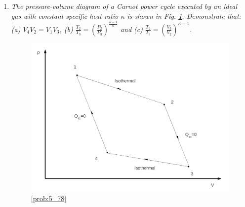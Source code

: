 \documentclass[12pts,a4paper,amsmath,amssymb,floatfix]{article}%
\newcommand{\frc}{\displaystyle\frac}
\begin{document}
\begin{enumerate}[label=\bfseries Problem \arabic*:]
\item \label{prob:5_78}{\it The pressure-volume diagram of a Carnot power cycle executed by an ideal gas with constant specific heat ratio $\kappa$ is shown in Fig. \ref{Prob_Saphiro_5.78}. Demonstrate that: (a) $V_{4}V_{2}=V_{1}V_{3}$, (b) $\frc{T_{2}}{T_{3}} = \left(\frc{P_{2}}{P_{3}}\right)^{\frc{\kappa - 1}{\kappa}}$ and (c) $\frc{T_{2}}{T_{3}}=\left(\frc{V_{3}}{V_{2}}\right)^{\kappa - 1}$.}
\begin{figure}[h]
\begin{center}
\includegraphics[width=8.cm,clip]{./Pics/Problem_5_78}
\caption{ \ref{prob:5_78}}
\label{Prob_Saphiro_5.78}
\end{center}
\end{figure}


\end{enumerate}
\end{document}
